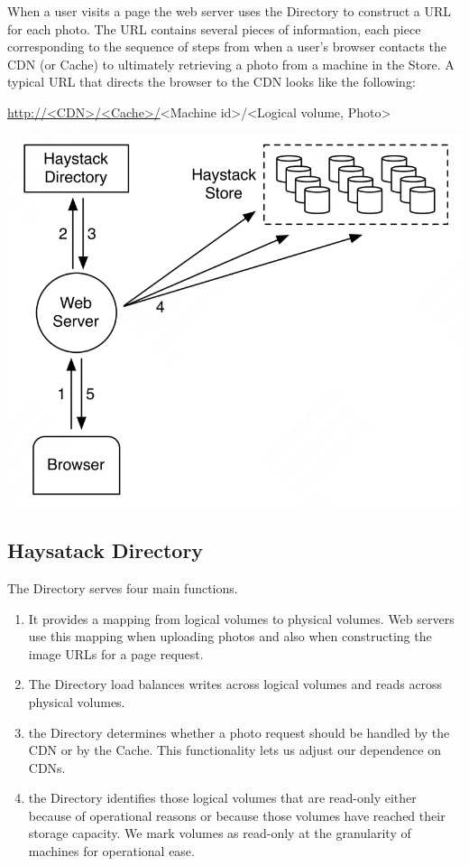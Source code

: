 \documentclass[11pt]{article}
\begin{document}
When a user visits a page the web server uses the Directory to construct a URL for each photo. The URL
contains several pieces of information, each piece corresponding to the sequence of steps from when a
user’s browser contacts the CDN (or Cache) to ultimately retrieving a photo from a machine in the
Store. A typical URL that directs the browser to the CDN looks like the following:
\begin{center}
\url{http://<CDN>/<Cache>/}<Machine id>/<Logical volume, Photo>
\end{center}

\begin{center}
\includegraphics[width=.8\textwidth]{../../images/papers/135.png}
\end{center}
\subsection{Haysatack Directory}
\label{sec:org7fabe14}
The Directory serves four main functions.
\begin{enumerate}
\item It provides a mapping from logical volumes to physical volumes. Web servers use this mapping when
uploading photos and also when constructing the image URLs for a page request.
\item The Directory load balances writes across logical volumes and reads across physical volumes.
\item the Directory determines whether a photo request should be handled by the CDN or by the Cache. This
functionality lets us adjust our dependence on CDNs.
\item the Directory identifies those logical volumes that are read-only either because of operational
reasons or because those volumes have reached their storage capacity. We mark volumes as read-only
at the granularity of machines for operational ease.
\end{enumerate}
\end{document}
